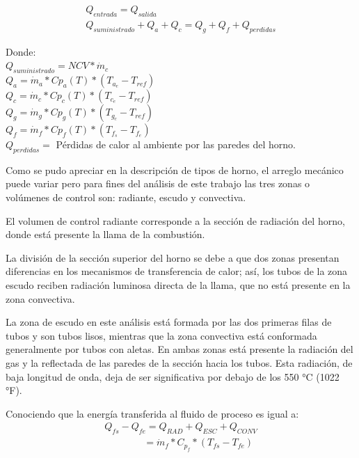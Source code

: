 \begin{equation}
    \label{eq:balance-global}
    \begin{gathered}
    Q_{entrada} = Q_{salida}\\
    Q_{suministrado} + Q_{a} + Q_{c} = 
    Q_{g} + Q_{f} + Q_{perdidas}
    \end{gathered}
\end{equation}
\par Donde:\\
$Q_{suministrado} = NCV * \dot m_{c}$\\
$Q_{a} = \dot m_{a} * Cp_{a}(T) * (T_{a_e} - T_{ref})$\\
$Q_{c} = \dot m_{c} * Cp_{c}(T) * (T_{c_e} - T_{ref})$\\
$Q_{g} = \dot m_{g} * Cp_{g}(T) * (T_{g_c} - T_{ref})$\\
$Q_{f} = \dot m_{f} * Cp_{f}(T) * (T_{f_s} - T_{f_e})$\\
$Q_{perdidas} =$ Pérdidas de calor al ambiente por las paredes del horno.
\par Como se pudo apreciar en la descripción de tipos de horno, el arreglo mecánico puede variar pero para fines del análisis de este trabajo las tres zonas o volúmenes de control son: radiante, escudo y convectiva. 
\par El volumen de control radiante corresponde a la sección de radiación del horno, donde está presente la llama de la combustión.
\par La división de la sección superior del horno se debe a que dos zonas presentan diferencias en los mecanismos de transferencia de calor; así, los tubos de la zona escudo reciben radiación luminosa directa de la llama, que no está presente en la zona convectiva.
\par La zona de escudo en este análisis está formada por las dos primeras filas de tubos y son tubos lisos, mientras que la zona convectiva está conformada generalmente por tubos con aletas. En ambas zonas está presente la radiación del gas y la reflectada de las paredes de la sección hacia los tubos. Esta radiación, de baja longitud de onda, deja de ser significativa por debajo de los 550 °C (1022 °F).
\par Conociendo que la energía transferida al fluido de proceso es igual a:
\begin{equation}
    \begin{gathered}
    Q_{fs} - Q_{fe} = Q_{RAD} + Q_{ESC} + Q_{CONV}\\
    \quad\quad\quad\quad = \dot m_f * C_{p_f} * (T_{fs} - T_{fe})
    \end{gathered}
\end{equation}
